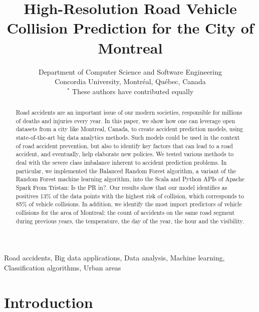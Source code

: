 \documentclass[conference]{IEEEtran}
\newcommand{\TG}[1]{\colorlet{saved}{.}\color{orange}From Tristan: #1\color{saved}}
\begin{document}
\title{High-Resolution Road Vehicle Collision Prediction for the City of Montreal}
\author{
Department of Computer Science and Software Engineering \\
Concordia University, Montréal, Québec, Canada\\
$^*$ These authors have contributed equally

}

\maketitle

\begin{abstract}

Road accidents are an important issue of our modern societies, responsible
for millions of deaths and injuries every year. 
In this paper, we show how one can leverage open datasets from a city like
Montreal, Canada, to create accident prediction models, using state-of-the-art
big data analytics methods.
Such models could be used in the context of road accident prevention, but also
to identify key factors that can lead to a road accident, and eventually, help
elaborate new policies.
We tested various methods to deal with the severe class imbalance inherent
to accident prediction problems. In particular, we implemented the Balanced Random Forest algorithm, a variant
of the Random Forest machine learning algorithm, into the Scala and Python
APIs of Apache Spark \TG{Is the PR in?}.
Our results show that our model identifies as positives 13\% of the data
points with the highest risk of collision, which corresponds to 85\% of 
vehicle collisions.
In addition, we identify the most import predictors of vehicle collisions for the area of Montreal: the count of accidents on the same road segment during previous years, the temperature, the day of the year, the hour and the visibility.

\end{abstract}

\begin{IEEEkeywords}
Road accidents, Big data applications, Data analysis, Machine learning, Classification algorithms, Urban areas
\end{IEEEkeywords}

\section{Introduction}
\end{document}
